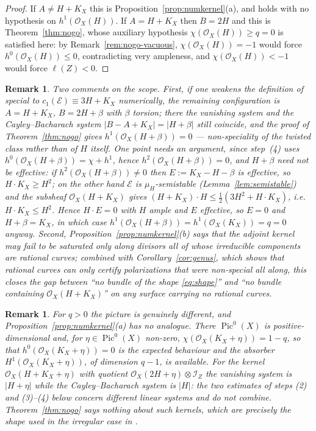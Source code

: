 \documentclass[10pt,a4paper]{amsart}
\newtheorem{remark}[theorem]{Remark}
\newcommand{\OO}{\mathcal{O}}
\newcommand{\EE}{\mathcal{E}}
\newcommand{\II}{\mathcal{I}}
\newcommand{\Pic}{\operatorname{Pic}}
\newcommand{\len}{\ell}
\begin{document}
\begin{proof}
If $A\neq H+K_X$ this is Proposition~\ref{prop:numkernel}(a), and holds with no hypothesis on $h^1(\OO_X(H))$. If $A=H+K_X$ then $B=2H$ and this is Theorem~\ref{thm:nogo}, whose auxiliary hypothesis $\chi(\OO_X(H))\ge q=0$ is satisfied here: by Remark~\ref{rem:nogo-vacuous}, $\chi(\OO_X(H))=-1$ would force $h^0(\OO_X(H))\le0$, contradicting very ampleness, and $\chi(\OO_X(H))<-1$ would force $\len(Z)<0$.
\end{proof}

\begin{remark}\label{rem:numerical-scope}
Two comments on the scope. First, if one weakens the definition of \emph{special} to $c_1(\EE)\equiv3H+K_X$ numerically, the remaining configuration is $A=H+K_X$, $B=2H+\beta$ with $\beta$ torsion; there the vanishing system and the Cayley--Bacharach system $|B-A+K_X|=|H+\beta|$ still coincide, and the proof of Theorem~\ref{thm:nogo} gives $h^1(\OO_X(H+\beta))=0$ --- non-speciality of the twisted class rather than of $H$ itself. One point needs an argument, since step~(4) uses $h^0(\OO_X(H+\beta))=\chi+h^1$, hence $h^2(\OO_X(H+\beta))=0$, and $H+\beta$ need not be effective: if $h^2(\OO_X(H+\beta))\neq0$ then $E:=K_X-H-\beta$ is effective, so $H\cdot K_X\ge H^2$; on the other hand $\EE$ is $\mu_H$-semistable (Lemma~\ref{lem:semistable}) and the subsheaf $\OO_X(H+K_X)$ gives $(H+K_X)\cdot H\le\tfrac12(3H^2+H\cdot K_X)$, i.e.\ $H\cdot K_X\le H^2$. Hence $H\cdot E=0$ with $H$ ample and $E$ effective, so $E=0$ and $H+\beta=K_X$, in which case $h^1(\OO_X(H+\beta))=h^1(\OO_X(K_X))=q=0$ anyway. Second, Proposition~\ref{prop:numkernel}(b) says that the adjoint kernel may fail to be saturated only along divisors all of whose irreducible components are rational curves; combined with Corollary~\ref{cor:genus}, which shows that rational curves can only certify polarizations that were non-special all along, this closes the gap between ``no bundle of the shape \eqref{eq:shape}'' and ``no bundle containing $\OO_X(H+K_X)$'' on any surface carrying no rational curves.
\end{remark}

\begin{remark}\label{rem:twisted-irregular}
For $q>0$ the picture is genuinely different, and Proposition~\ref{prop:numkernel}(a) has no analogue. There $\Pic^0(X)$ is positive-dimensional and, for $\eta\in\Pic^0(X)$ non-zero, $\chi(\OO_X(K_X+\eta))=1-q$, so that $h^0(\OO_X(K_X+\eta))=0$ is the expected behaviour and the absorber $H^1(\OO_X(K_X+\eta))$, of dimension $q-1$, is available. For the kernel $\OO_X(H+K_X+\eta)$ with quotient $\OO_X(2H+\eta)\otimes\II_Z$ the vanishing system is $|H+\eta|$ while the Cayley--Bacharach system is $|H|$: the two estimates of steps (2) and (3)--(4) below concern different linear systems and do not combine. Theorem~\ref{thm:nogo} says nothing about such kernels, which are precisely the shape used in the irregular case in \cite{Cas19}.
\end{remark}
\end{document}
